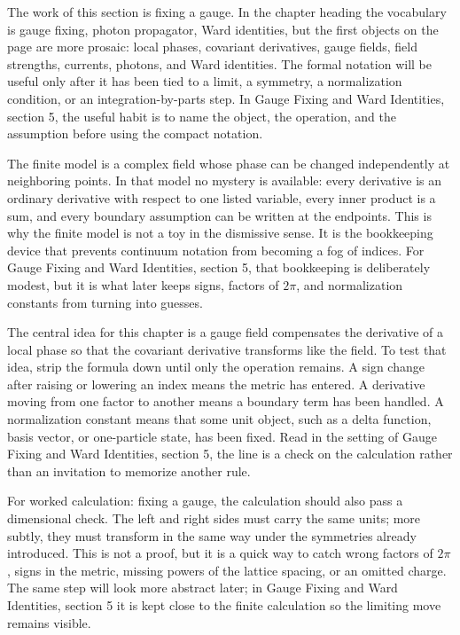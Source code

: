 The work of this section is fixing a gauge.  In the chapter heading the vocabulary is gauge fixing, photon propagator, Ward identities, but the first objects on the page are more prosaic: local phases, covariant derivatives, gauge fields, field strengths, currents, photons, and Ward identities.  The formal notation will be useful only after it has been tied to a limit, a symmetry, a normalization condition, or an integration-by-parts step.  In Gauge Fixing and Ward Identities, section 5, the useful habit is to name the object, the operation, and the assumption before using the compact notation.

The finite model is a complex field whose phase can be changed independently at neighboring points.  In that model no mystery is available: every derivative is an ordinary derivative with respect to one listed variable, every inner product is a sum, and every boundary assumption can be written at the endpoints.  This is why the finite model is not a toy in the dismissive sense.  It is the bookkeeping device that prevents continuum notation from becoming a fog of indices.  For Gauge Fixing and Ward Identities, section 5, that bookkeeping is deliberately modest, but it is what later keeps signs, factors of \(2\pi\), and normalization constants from turning into guesses.

The central idea for this chapter is a gauge field compensates the derivative of a local phase so that the covariant derivative transforms like the field.  To test that idea, strip the formula down until only the operation remains.  A sign change after raising or lowering an index means the metric has entered.  A derivative moving from one factor to another means a boundary term has been handled.  A normalization constant means that some unit object, such as a delta function, basis vector, or one-particle state, has been fixed.  Read in the setting of Gauge Fixing and Ward Identities, section 5, the line is a check on the calculation rather than an invitation to memorize another rule.

For worked calculation: fixing a gauge, the calculation should also pass a dimensional check.  The left and right sides must carry the same units; more subtly, they must transform in the same way under the symmetries already introduced.  This is not a proof, but it is a quick way to catch wrong factors of \(2\pi\), signs in the metric, missing powers of the lattice spacing, or an omitted charge.  The same step will look more abstract later; in Gauge Fixing and Ward Identities, section 5 it is kept close to the finite calculation so the limiting move remains visible.

